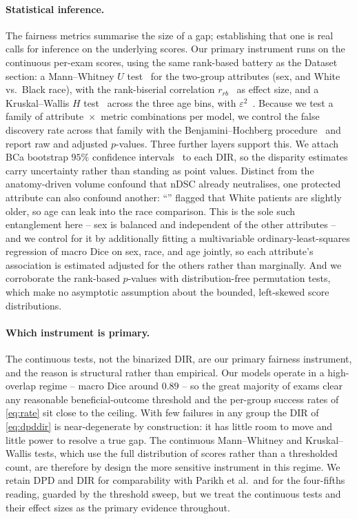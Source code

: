 \paragraph{Statistical inference.}
The fairness metrics summarise the size of a gap; establishing that one is real
calls for inference on the underlying scores. Our primary instrument runs on the
continuous per-exam scores, using the same rank-based battery as the
Dataset section: a Mann--Whitney $U$ test~\cite{mann1947test} for the two-group
attributes (sex, and White vs.\ Black race), with the rank-biserial correlation
$r_{rb}$~\cite{wendt1972rankbiserial} as effect size, and a Kruskal--Wallis $H$
test~\cite{kruskal1952ranks} across the three age bins, with
$\varepsilon^2$~\cite{tomczak2014effectsize}. Because we test a family of
attribute~$\times$~metric combinations per model, we control the false discovery
rate across that family with the Benjamini--Hochberg
procedure~\cite{benjamini1995fdr} and report raw and adjusted $p$-values. Three
further layers support this. We attach BCa bootstrap $95\%$ confidence
intervals~\cite{efron1987bca} to each DIR, so the disparity estimates carry
uncertainty rather than standing as point values. Distinct from the anatomy-driven volume confound that nDSC already neutralises,
one protected attribute can also confound another: ``''
flagged that White patients are slightly older, so age can leak into the race
comparison. This is the sole such entanglement here -- sex is balanced and
independent of the other attributes -- and we control for it by additionally
fitting a multivariable ordinary-least-squares regression of macro Dice on sex,
race, and age jointly, so each attribute's association is estimated adjusted for
the others rather than marginally. And we corroborate the rank-based
$p$-values with distribution-free permutation tests, which make no asymptotic
assumption about the bounded, left-skewed score distributions.

\paragraph{Which instrument is primary.}
The continuous tests, not the binarized DIR, are our primary fairness instrument,
and the reason is structural rather than empirical. Our models operate in a
high-overlap regime -- macro Dice around $0.89$ -- so the great majority of exams
clear any reasonable beneficial-outcome threshold and the per-group success rates
of \autoref{eq:rate} sit close to the ceiling. With few failures in any group the
DIR of \autoref{eq:dpddir} is near-degenerate by construction: it has little room
to move and little power to resolve a true gap. The continuous Mann--Whitney and
Kruskal--Wallis tests, which use the full distribution of scores rather than a
thresholded count, are therefore by design the more sensitive instrument in this
regime. We retain DPD and DIR for comparability with Parikh et al.\ and for the
four-fifths reading, guarded by the threshold sweep, but we treat the continuous
tests and their effect sizes as the primary evidence throughout.

